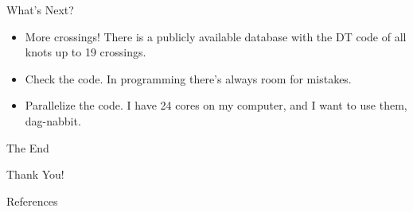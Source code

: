 \documentclass{beamer}
\begin{document}
    \begin{frame}{What's Next?}
        \begin{itemize}
            \item More crossings! There is a publicly available database with
                the DT code of all knots up to 19 crossings.
            \item Check the code. In programming there's always room for
                mistakes.
            \item Parallelize the code. I have 24 cores on my computer, and I
                want to use them, dag-nabbit.
        \end{itemize}
    \end{frame}
    \begin{frame}{The End}
        \begin{center}
            Thank You!
        \end{center}
    \end{frame}
    \begin{frame}[allowframebreaks]{References}
        
        
    \end{frame}
\end{document}
